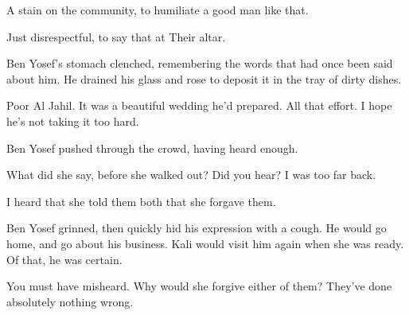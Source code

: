 \documentclass{amsart}
\begin{document}
A stain on the community, to humiliate a good man like that. 

Just disrespectful, to say that at Their altar. 

Ben Yosef's stomach clenched, remembering the words that had once been said about him. He drained his glass and rose to deposit it in the tray of dirty dishes. 

Poor Al Jahil. It was a beautiful wedding he'd prepared. All that effort. I hope he's not taking it too hard. 

Ben Yosef pushed through the crowd, having heard enough. 

What did she say, before she walked out? Did you hear? I was too far back. 

I heard that she told them both that she forgave them. 

Ben Yosef grinned, then quickly hid his expression with a cough. He would go home, and go about his business. Kali would visit him again when she was ready. Of that, he was certain. 

You must have misheard. Why would she forgive either of them? They've done absolutely nothing wrong.
\end{document}
